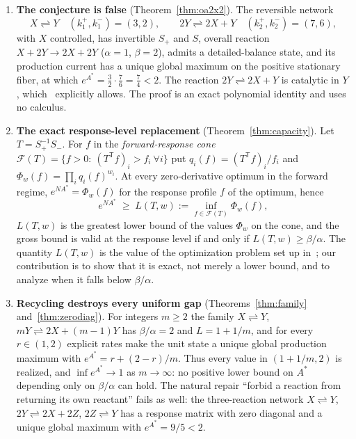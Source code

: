\documentclass[11pt,reqno]{amsart}
\theoremstyle{plain}
\theoremstyle{definition}
\theoremstyle{remark}
\numberwithin{equation}{section}
\newcommand{\Sp}{S_{+}}
\newcommand{\Sm}{S_{-}}
\newcommand{\T}{\mathsf{T}}
\newcommand{\cone}{\mathcal{F}}
\begin{document}
\begin{enumerate}[label=(\Alph*),leftmargin=2.2em]
\item\label{res:A} \textbf{The conjecture is false} (Theorem~\ref{thm:oa2x2}).  The reversible network
\[
X\rightleftharpoons Y\quad(k^+_1,k^-_1)=(3,2),\qquad 2Y\rightleftharpoons 2X+Y\quad(k^+_2,k^-_2)=(7,6),
\]
with $X$ controlled, has invertible $\Sp$ and $S$, overall reaction $X+2Y\to2X+2Y$ ($\alpha=1$, $\beta=2$), admits a detailed-balance state, and its production current has a unique global maximum on the positive stationary fiber, at which $e^{A^*}=\tfrac32\cdot\tfrac76=\tfrac74<2$.  The reaction $2Y\rightleftharpoons 2X+Y$ is catalytic in $Y$, which~\cite{DDL24} explicitly allows.  The proof is an exact polynomial identity and uses no calculus.

\item\label{res:B} \textbf{The exact response-level replacement} (Theorem~\ref{thm:capacity}).  Let $T=\Sp^{-1}\Sm$.  For $f$ in the \emph{forward-response cone} $\cone(T)=\{f>0:\ (T^{\T}f)_i>f_i\ \forall i\}$ put $q_i(f)=(T^{\T}f)_i/f_i$ and $\Phi_w(f)=\prod_i q_i(f)^{w_i}$.  At every zero-derivative optimum in the forward regime, $e^{NA^*}=\Phi_w(f)$ for the response profile $f$ of the optimum, hence
\[
e^{NA^*}\;\ge\;L(T,w):=\inf_{f\in\cone(T)}\Phi_w(f),
\]
$L(T,w)$ is the greatest lower bound of the values $\Phi_w$ on the cone, and the gross bound is valid at the response level if and only if $L(T,w)\ge\beta/\alpha$.  The quantity $L(T,w)$ is the value of the optimization problem set up in~\cite[Supplementary Note~11]{DDL24}; our contribution is to show that it is exact, not merely a lower bound, and to analyze when it falls below $\beta/\alpha$.

\item\label{res:C} \textbf{Recycling destroys every uniform gap} (Theorems~\ref{thm:family} and~\ref{thm:zerodiag}).  For integers $m\ge2$ the family $X\rightleftharpoons Y$, $mY\rightleftharpoons 2X+(m-1)Y$ has $\beta/\alpha=2$ and $L=1+1/m$, and for every $r\in(1,2)$ explicit rates make the unit state a unique global production maximum with $e^{A^*}=r+(2-r)/m$.  Thus every value in $(1+1/m,2)$ is realized, and $\inf e^{A^*}\to1$ as $m\to\infty$: no positive lower bound on $A^*$ depending only on $\beta/\alpha$ can hold.  The natural repair ``forbid a reaction from returning its own reactant'' fails as well: the three-reaction network $X\rightleftharpoons Y$, $2Y\rightleftharpoons 2X+2Z$, $2Z\rightleftharpoons Y$ has a response matrix with zero diagonal and a unique global maximum with $e^{A^*}=9/5<2$.


\end{enumerate}
\end{document}

